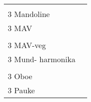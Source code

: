 \documentclass{article}\usepackage[ngerman]{babel}\usepackage{geometry}\usepackage{lmodern}
\begin{document}
\begin{table}[p]
  \begin{tabular}{ll}    \hspace{-2em}    \fbox{\begin{minipage}[t][6cm][t]{8cm}
        \fontsize{45}{54} \selectfont
        \phantom{ }\\
      \phantom{ }3 Mandoline    \end{minipage}}
    &
\fbox{\begin{minipage}[t][6cm][t]{8cm}
        \fontsize{45}{54} \selectfont
        \phantom{ }\\
        \phantom{ } 3 MAV      \end{minipage}}\\    \hspace{-2em}    \fbox{\begin{minipage}[t][6cm][t]{8cm}
        \fontsize{45}{54} \selectfont
        \phantom{ }\\
      \phantom{ }3 MAV-veg    \end{minipage}}
    &
\fbox{\begin{minipage}[t][6cm][t]{8cm}
        \fontsize{45}{54} \selectfont
        \phantom{ }\\
        \phantom{ } 3 Mund- harmonika      \end{minipage}}\\    \hspace{-2em}    \fbox{\begin{minipage}[t][6cm][t]{8cm}
        \fontsize{45}{54} \selectfont
        \phantom{ }\\
      \phantom{ }3 Oboe    \end{minipage}}
    &
\fbox{\begin{minipage}[t][6cm][t]{8cm}
        \fontsize{45}{54} \selectfont
        \phantom{ }\\
        \phantom{ } 3 Pauke      \end{minipage}}\\\end{tabular}
\end{table}
\end{document}
